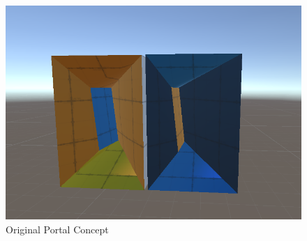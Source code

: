\begin{figure}[H]
\centering
\includegraphics[scale=0.33]{Figures/portalconcept.png}
\caption{Original Portal Concept}
\end{figure}

